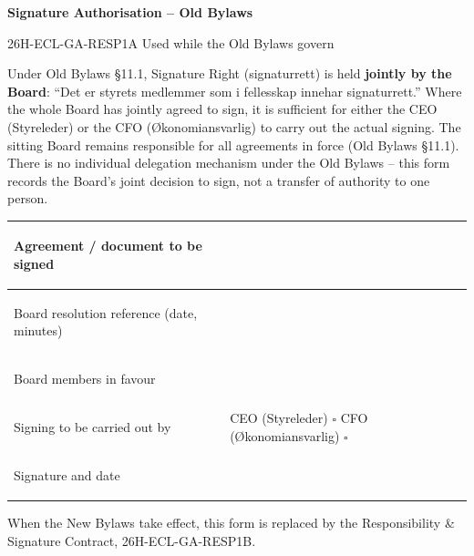 \documentclass{../../../Common/Latex/Templates/rapport}
\date{\meetingdate, \meetingtime}
\begin{document}
\reportmainmatter
\small
\setlength{\parindent}{0pt}
\setlength{\tabcolsep}{6pt}
\renewcommand{\arraystretch}{1.2}

\begin{center}
  {\Large\bfseries Signature Authorisation -- Old Bylaws}\par
  \vspace{0.15cm}
  {\normalsize 26H-ECL-GA-RESP1A \textperiodcentered{} Used while the Old Bylaws govern}\par
  \vspace{0.1cm}
  {\small \meetingline}\par
\end{center}

\vspace{0.2cm}
Under Old Bylaws \S11.1, Signature Right (signaturrett) is held \textbf{jointly by the Board}: ``Det er styrets medlemmer som i fellesskap innehar signaturrett.'' Where the whole Board has jointly agreed to sign, it is sufficient for either the CEO (Styreleder) or the CFO (Økonomiansvarlig) to carry out the actual signing. The sitting Board remains responsible for all agreements in force (Old Bylaws \S11.1). There is no individual delegation mechanism under the Old Bylaws -- this form records the Board's joint decision to sign, not a transfer of authority to one person.

\vspace{0.4cm}
\begin{tabularx}{\textwidth}{|>{\bfseries\raggedright\arraybackslash}p{4.5cm}|X|}
  \hline
  Agreement / document to be signed          & \rule{0pt}{1.4cm}                                                                                   \\
  \hline
  Board resolution reference (date, minutes) & \rule{0pt}{1.2cm}                                                                                   \\
  \hline
  Board members in favour                    & \rule{0pt}{1.4cm}                                                                                   \\
  \hline
  Signing to be carried out by               & \rule{0pt}{0.9cm}CEO (Styreleder) \quad $\square$ \quad\quad CFO (Økonomiansvarlig) \quad $\square$ \\
  \hline
  Signature and date                         & \rule{0pt}{1.6cm}                                                                                   \\
  \hline
\end{tabularx}

\vfill
When the New Bylaws take effect, this form is replaced by the Responsibility \& Signature Contract, 26H-ECL-GA-RESP1B.
\end{document}
